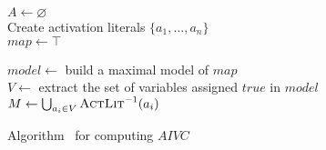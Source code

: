 \begin{algorithm}[t]
  \BlankLine
  $A \leftarrow \varnothing$\\
  Create activation literals $\{a_1, \ldots, a_n\}$ \\
  $map \leftarrow \top$ \\
  \BlankLine

   { \label{alg:aivc:checksat}
    $model \leftarrow $ build a maximal model of $map$  \label{alg:aivc:maxsat} \\
    $V \leftarrow$ extract the set of variables assigned $true$ in $model$ \label{alg:aivc:assignv} \\
    $M \leftarrow \bigcup_{a_i \in V} \textsc{ActLit} ^{-1}(a_i)$ \label{alg:aivc:assignm} \\ %
\BlankLine
  }
\caption{Algorithm \aivcalg ~for computing $AIVC$}
\label{alg:aivc}
\end{algorithm}

